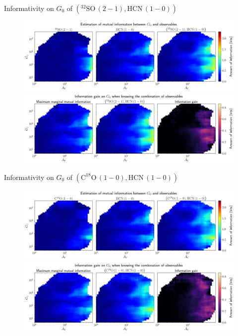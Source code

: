 \documentclass{beamer}
\begin{document}
\begin{frame}{Informativity on $G_0$ of $\left(\mathrm{^{32}SO\,(2-1)},\mathrm{HCN\,(1-0)}\right)$}
    \begin{figure}
        \centering
        \includegraphics[width=0.95\linewidth]{../mi/g0__32so21_hcn10_mi.png}
        \vfill
        \includegraphics[width=0.95\linewidth]{../mi/g0__32so21_hcn10_mi_gain.png}
    \end{figure}
\end{frame}

\begin{frame}{Informativity on $G_0$ of $\left(\mathrm{C^{18}O\,(1-0)},\mathrm{HCN\,(1-0)}\right)$}
    \begin{figure}
        \centering
        \includegraphics[width=0.95\linewidth]{../mi/g0__c18o10_hcn10_mi.png}
        \vfill
        \includegraphics[width=0.95\linewidth]{../mi/g0__c18o10_hcn10_mi_gain.png}
    \end{figure}
\end{frame}
\end{document}
